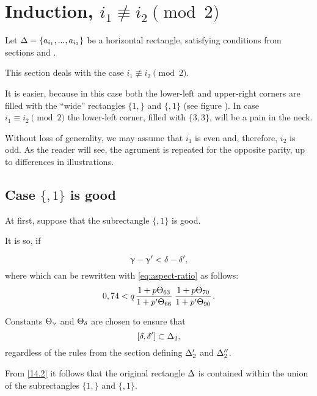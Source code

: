 \section{Induction, $i_1 \not\equiv i_2 \pmod 2$}
\label{sc:odd}

Let $\Delta = \{ a_{i_1}, ..., a_{i_2}\}$ be a horizontal rectangle,
satisfying conditions from sections  and .

This section deals with the case $i_1 \not\equiv i_2 \pmod 2$.

It is easier, because in this case both the lower-left and upper-right corners
are filled with the ``wide'' rectangles $\{1,\}$ and $\{,1\}$ (see figure ).
In case $i_1 \equiv i_2 \pmod 2$ the lower-left corner, filled with $\{3,3\}$,
will be a pain in the neck.

Without loss of generality, we may assume that $i_1$ is even and, therefore, $i_2$ is odd.
As the reader will see, the agrument is repeated for the opposite parity,
up to differences in illustrations.

\subsection{Case $\{, 1\}$ is good}

At first, suppose that the subrectangle $\{,1\}$ is good.

It is so, if


\begin{equation}\label{14.1}
	\upgamma - \upgamma' < \delta - \delta',
\end{equation}
where
which can be rewritten with \ref{eq:aspect-ratio} as follows:
\begin{equation}\label{14.2}
	0,74 < q \up{63}{66} \up{70}{90}.
\end{equation}

Constants $\Theta_{\upgamma}$ and $\Theta_{\delta}$ are chosen to ensure that
\begin{equation*}
	\left[ \delta, \delta' \right] \subset \Delta_2,
\end{equation*}
regardless of the rules from the section  defining $\Delta_2'$ and $\Delta_2''$.

From \ref{14.2} it follows that the original rectangle $\Delta$ is contained
within the union of the subrectangles $\{1,\}$ and $\{,1\}$.


